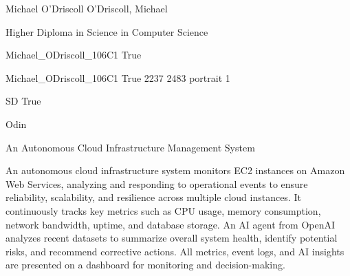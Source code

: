 
\begingroup{}\relax



\def\Key{Michael_ODriscoll_106C1}

{Michael O'Driscoll}
{O'Driscoll, Michael}

{Higher Diploma in Science in Computer Science}

{Michael_ODriscoll_106C1}
{True}

{Michael_ODriscoll_106C1}
{True}
{2237}
{2483}
{portrait}
{1}

{SD}
{True}

{Odin}

{An Autonomous Cloud Infrastructure Management System}

{An autonomous cloud infrastructure system monitors EC2 instances on Amazon Web Services, analyzing and responding to operational events to ensure reliability, scalability, and resilience across multiple cloud instances. It continuously tracks key metrics such as CPU usage, memory consumption, network bandwidth, uptime, and database storage. An AI agent from OpenAI analyzes recent datasets to summarize overall system health, identify potential risks, and recommend corrective actions. All metrics, event logs, and AI insights are presented on a dashboard for monitoring and decision-making.}

